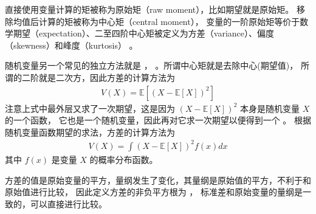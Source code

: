 \documentclass[letterpaper,10pt,english]{sphinxmanual}
\begin{document}
直接使用变量计算的矩被称为原始矩（raw moment），比如期望就是原始矩。
移除均值后计算的矩被称为中心矩（central moment），
变量的一阶原始矩等价于数学期望（expectation）、二至四阶中心矩被定义为方差（variance）、偏度（skewness）和峰度（kurtosis）
。

随机变量另一个常见的独立方法就是 
， 。所谓中心矩就是去除中心(期望值)，
所谓的二阶就是二次方，因此方差的计算方法为
\begin{equation}\label{equation:概率基础/content:概率基础/content:43}
\begin{split}V(X) = \mathbb{E}[(X-\mathbb{E}[X])^2]\end{split}
\end{equation}
注意上式中最外层又求了一次期望，这是因为 \((X-\mathbb{E}[X])^2\) 本身是随机变量 \(X\) 的一个函数，
它也是一个随机变量，因此再对它求一次期望以便得到一个  。
根据随机变量函数期望的求法，方差的计算方法为
\begin{equation}\label{equation:概率基础/content:概率基础/content:44}
\begin{split}V(X) = \int (X-\mathbb{E}[X])^2 f(x) dx\end{split}
\end{equation}
其中 \(f(x)\) 是变量 \(X\) 的概率分布函数。

方差的值是原始变量的平方，量纲发生了变化，其量纲是原始值的平方，不利于和原始值进行比较，
因此定义方差的非负平方根为  ，
标准差和原始变量的量纲是一致的，可以直接进行比较。
\end{document}
